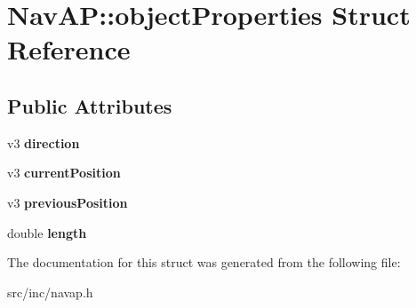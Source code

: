 \hypertarget{structNavAP_1_1objectProperties}{}\section{Nav\+AP\+:\+:object\+Properties Struct Reference}
\label{structNavAP_1_1objectProperties}
\subsection*{Public Attributes}
\begin{DoxyCompactItemize}
\item 
\mbox{\label{structNavAP_1_1objectProperties_ad7781f37d1875024fac2ebc377ae0879}} 
v3 {\bfseries direction}
\item 
\mbox{\label{structNavAP_1_1objectProperties_a3404b4f1158cc7a8a59564fb228e7d2e}} 
v3 {\bfseries current\+Position}
\item 
\mbox{\label{structNavAP_1_1objectProperties_a2646142866fdd3a8a3f4d6a74524124f}} 
v3 {\bfseries previous\+Position}
\item 
\mbox{\label{structNavAP_1_1objectProperties_a81f55d3cd5eb0b6a706a02d8f73611b5}} 
double {\bfseries length}
\end{DoxyCompactItemize}


The documentation for this struct was generated from the following file\+:\begin{DoxyCompactItemize}
\item 
src/inc/navap.\+h\end{DoxyCompactItemize}
